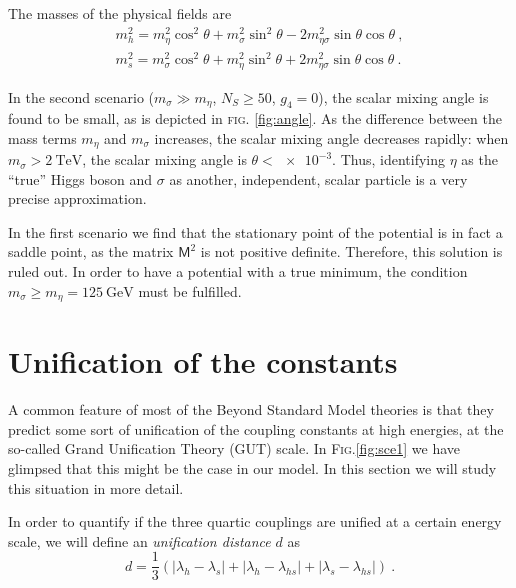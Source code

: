 \documentclass[aps,prd,preprintnumbers,nofootinbibn,twocolumn]{revtex4}
\begin{document}
The masses of the physical fields are
\begin{align}
m_h^2 = m_\eta^2 \cos^2 \theta + m_\sigma^2 \sin^2 \theta - 2 m_{\eta\sigma}^2 \sin \theta \cos \theta\ , \\
m_s^2 = m_\sigma^2 \cos^2 \theta + m_\eta^2 \sin^2 \theta + 2 m_{\eta\sigma}^2 \sin \theta \cos \theta\ .
\end{align}

In the second scenario ($m_\sigma \gg m_\eta$, $N_S \geq 50$, $g_4=0$), the scalar mixing angle is found to be small, as is depicted in \textsc{fig.} \ref{fig:angle}. As the difference between the mass terms $m_\eta$ and $m_\sigma$ increases, the scalar mixing angle decreases rapidly: when $m_\sigma > \SI{2}{\tera\electronvolt}$, the scalar mixing angle is $\theta < \num{e-3}$. Thus, identifying $\eta$ as the ``true'' Higgs boson and $\sigma$ as another, independent, scalar particle is a very precise approximation. 

In the first scenario we find that the stationary point of the potential is in fact a saddle point, as the matrix $\mathsf{M}^2$ is not positive definite. Therefore, this solution is ruled out. In order to have a potential with a true minimum, the condition $m_\sigma \geq m_\eta = \SI{125}{\giga\electronvolt}$ must be fulfilled.


\section{Unification of the constants}\label{sec:GUT}

A common feature of most of the Beyond Standard Model theories is that they predict some sort of unification of the coupling constants at high energies, at the so-called Grand Unification Theory (GUT) scale. In \textsc{Fig.}\ref{fig:sce1} we have glimpsed that this might be the case in our model. In this section we will study this situation in more detail.

In order to quantify if the three quartic couplings are unified at a certain energy scale, we will define an \textit{unification distance} $d$ as
\begin{equation}
d = \frac{1}{3}(|\lambda_h - \lambda_s| + |\lambda_h - \lambda_{hs}|+ |\lambda_s - \lambda_{hs}|)\ .
\end{equation}
\end{document}
